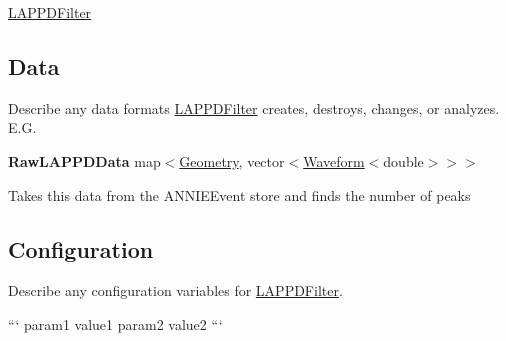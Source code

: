 \hyperlink{classLAPPDFilter}{L\-A\-P\-P\-D\-Filter}

\subsection*{Data}

Describe any data formats \hyperlink{classLAPPDFilter}{L\-A\-P\-P\-D\-Filter} creates, destroys, changes, or analyzes. E.\-G.

{\bfseries Raw\-L\-A\-P\-P\-D\-Data} {\ttfamily map$<$\hyperlink{classGeometry}{Geometry}, vector$<$\hyperlink{classWaveform}{Waveform}$<$double$>$$>$$>$}
\begin{DoxyItemize}
\item Takes this data from the {\ttfamily A\-N\-N\-I\-E\-Event} store and finds the number of peaks
\end{DoxyItemize}

\subsection*{Configuration}

Describe any configuration variables for \hyperlink{classLAPPDFilter}{L\-A\-P\-P\-D\-Filter}.

``` param1 value1 param2 value2 ``` 